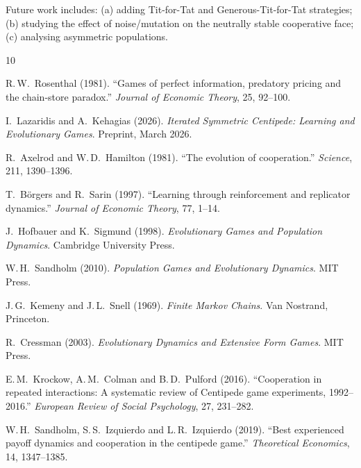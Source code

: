 \documentclass[12pt,a4paper]{article}
\begin{document}
Future work includes: (a) adding Tit-for-Tat and Generous-Tit-for-Tat
strategies; (b) studying the effect of noise/mutation on the neutrally stable
cooperative face; (c) analysing asymmetric populations.

\begin{thebibliography}{10}

  R.\,W.~Rosenthal (1981).
  ``Games of perfect information, predatory pricing and the chain-store
  paradox.''
  \textit{Journal of Economic Theory}, 25, 92--100.

  I.~Lazaridis and A.~Kehagias (2026).
  \textit{Iterated Symmetric Centipede: Learning and Evolutionary Games}.
  Preprint, March 2026.

  R.~Axelrod and W.\,D.~Hamilton (1981).
  ``The evolution of cooperation.''
  \textit{Science}, 211, 1390--1396.

  T.~B\"orgers and R.~Sarin (1997).
  ``Learning through reinforcement and replicator dynamics.''
  \textit{Journal of Economic Theory}, 77, 1--14.

  J.~Hofbauer and K.~Sigmund (1998).
  \textit{Evolutionary Games and Population Dynamics}.
  Cambridge University Press.

  W.\,H.~Sandholm (2010).
  \textit{Population Games and Evolutionary Dynamics}.
  MIT Press.

  J.\,G.~Kemeny and J.\,L.~Snell (1969).
  \textit{Finite Markov Chains}.
  Van Nostrand, Princeton.

  R.~Cressman (2003).
  \textit{Evolutionary Dynamics and Extensive Form Games}.
  MIT Press.

  E.\,M.~Krockow, A.\,M.~Colman and B.\,D.~Pulford (2016).
  ``Cooperation in repeated interactions: A systematic review of Centipede
  game experiments, 1992--2016.''
  \textit{European Review of Social Psychology}, 27, 231--282.

  W.\,H.~Sandholm, S.\,S.~Izquierdo and L.\,R.~Izquierdo (2019).
  ``Best experienced payoff dynamics and cooperation in the centipede game.''
  \textit{Theoretical Economics}, 14, 1347--1385.

\end{thebibliography}

\appendix
\end{document}
